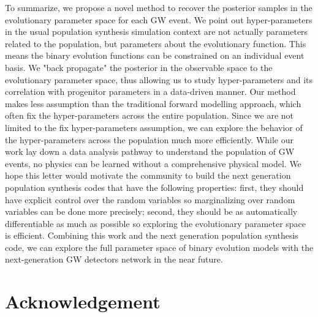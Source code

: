 \documentclass[twocolumn]{aastex631}
\begin{document}
To summarize, we propose a novel method to recover the posterior samples in the evolutionary parameter space for each GW event.
We point out hyper-parameters in the usual population synthesis simulation context are not actually parameters related to the population,
but parameters about the evolutionary function.
This means the binary evolution functions can be constrained on an individual event basis.
We "back propagate" the posterior in the observable space to the evolutionary parameter space,
thus allowing us to study hyper-parameters and its correlation with progenitor parameters in a data-driven manner.
Our method makes less assumption than the traditional forward modelling approach,
which often fix the hyper-parameters across the entire population.
Since we are not limited to the fix hyper-parameters assumption, we can explore the behavior of the hyper-parameters across the population much more efficiently.
While our work lay down a data analysis pathway to understand the population of GW events,
no physics can be learned without a comprehensive physical model.
We hope this letter would motivate the community to build the next generation population synthesis codes that have the following properties:
first, they should have explicit control over the random variables so marginalizing over random variables can be done more precisely;
second, they should be as automatically differentiable as much as possible so exploring the evolutionary parameter space is efficient.
Combining this work and the next generation population synthesis code,
we can explore the full parameter space of binary evolution models with the next-generation GW detectors network in the near future.


\section{Acknowledgement}


\end{document}
